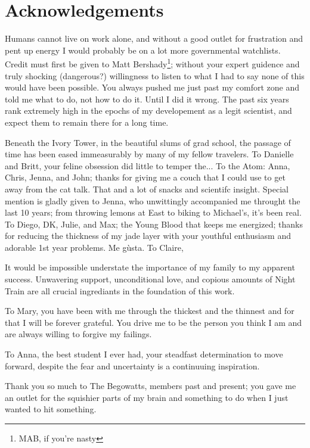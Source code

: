 \chapter*{Acknowledgements}

Humans cannot live on work alone, and without a good outlet for frustration and pent up energy I would probably be on a lot more governmental watchlists. Credit must first be given to Matt Bershady\footnote{MAB, if you're nasty}; without your expert guidence and truly shocking (dangerous?) willingness to listen to what I had to say none of this would have been possible. You always pushed me just past my comfort zone and told me what to do, not how to do it. Until I did it wrong. The past six years rank extremely high in the epochs of my developement as a legit scientist, and expect them to remain there for a long time.

Beneath the Ivory Tower, in the beautiful slums of grad school, the passage of time has been eased immeasurably by many of my fellow travelers. To Danielle and Britt, your feline obsession did little to temper the... To the Atom: Anna, Chris, Jenna, and John; thanks for giving me a couch that I could use to get away from the cat talk. That and a lot of snacks and scientifc insight. Special mention is gladly given to Jenna, who unwittingly accompanied me throught the last 10 years; from throwing lemons at East to biking to Michael's, it's been real. To Diego, DK, Julie, and Max; the Young Blood that keeps me energized; thanks for reducing the thickness of my jade layer with your youthful enthusiasm and adorable 1st year problems. Me g\`usta. To Claire, 

It would be impossible understate the importance of my family to my apparent success. Unwavering support, unconditional love, and copious amounts of Night Train are all crucial ingrediants in the foundation of this work.

To Mary, you have been with me through the thickest and the thinnest and for that I will be forever grateful. You drive me to be the person you think I am and are always willing to forgive my failings.

To Anna, the best student I ever had, your steadfast determination to move forward, despite the fear and uncertainty is a continuuing inspiration.

Thank you so much to The Begowatts, members past and present; you gave me an outlet for the squishier parts of my brain and something to do when I just wanted to hit something.

